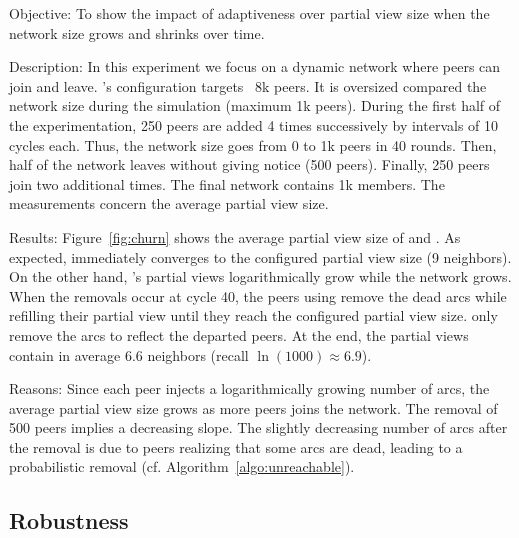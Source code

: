 \begin{asparadesc}

\item[Objective:] To show the impact of adaptiveness over partial view size when
  the network size grows and shrinks over time.
\item[Description:] In this experiment we focus on a dynamic network where peers
  can join and leave.  \CYCLON's configuration targets ~8k peers. It is
  oversized compared the network size during the simulation (maximum 1k
  peers). During the first half of the experimentation, 250 peers are added 4
  times successively by intervals of 10 cycles each. Thus, the network size goes
  from 0 to 1k peers in 40 rounds. Then, half of the network leaves without
  giving notice (500 peers). Finally, 250 peers join two additional times. The
  final network contains 1k members. The measurements concern the average
  partial view size.
\item[Results:] Figure~\ref{fig:churn} shows the average partial view size of
  \SPRAY and \CYCLON. As expected, \CYCLON immediately converges to the
  configured partial view size (9 neighbors). On the other hand, \SPRAY's
  partial views logarithmically grow while the network grows. When the removals
  occur at cycle 40, the peers using \CYCLON remove the dead arcs while
  refilling their partial view until they reach the configured partial view
  size. \SPRAY only remove the arcs to reflect the departed peers. At the end,
  the \SPRAY partial views contain in average 6.6 neighbors (recall
  $\ln(1000)\approx 6.9$).
\item[Reasons:] Since each peer injects a logarithmically growing number of
  arcs, the average partial view size grows as more peers joins the network.
  The removal of 500 peers implies a decreasing slope. The slightly decreasing
  number of arcs after the removal is due to peers realizing that some arcs are
  dead, leading to a probabilistic removal (cf. Algorithm~\ref{algo:unreachable}).
\end{asparadesc}


\subsection{Robustness}

